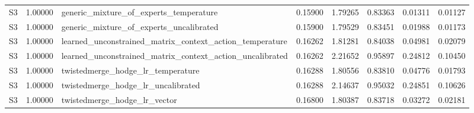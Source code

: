 \begin{tabular}{lrlrrrrr}
S3 & 1.00000 & generic_mixture_of_experts_temperature & 0.15900 & 1.79265 & 0.83363 & 0.01311 & 0.01127 \\
S3 & 1.00000 & generic_mixture_of_experts_uncalibrated & 0.15900 & 1.79529 & 0.83451 & 0.01988 & 0.01173 \\
S3 & 1.00000 & learned_unconstrained_matrix_context_action_temperature & 0.16262 & 1.81281 & 0.84038 & 0.04981 & 0.02079 \\
S3 & 1.00000 & learned_unconstrained_matrix_context_action_uncalibrated & 0.16262 & 2.21652 & 0.95897 & 0.24812 & 0.10450 \\
S3 & 1.00000 & twistedmerge_hodge_lr_temperature & 0.16288 & 1.80556 & 0.83810 & 0.04776 & 0.01793 \\
S3 & 1.00000 & twistedmerge_hodge_lr_uncalibrated & 0.16288 & 2.14637 & 0.95032 & 0.24851 & 0.10626 \\
S3 & 1.00000 & twistedmerge_hodge_lr_vector & 0.16800 & 1.80387 & 0.83718 & 0.03272 & 0.02181 \\
\bottomrule
\end{tabular}
